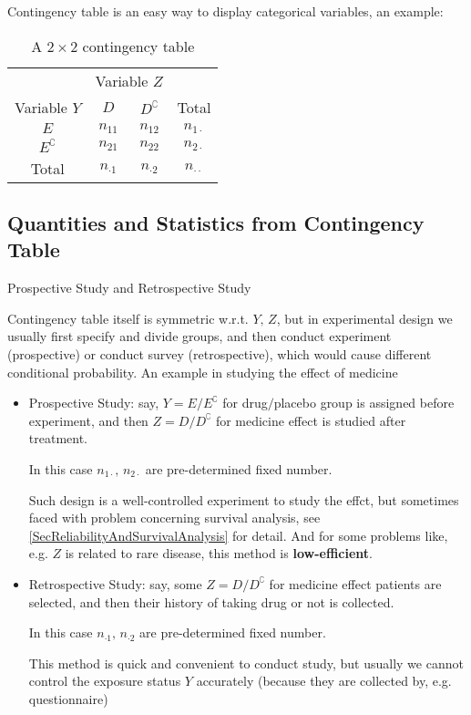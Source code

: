 Contingency table is an easy way to display categorical variables, an example:
\begin{table}[H]
    \centering
    \renewcommand\arraystretch{1}
    \caption{A $ 2\times 2 $ contingency table}
    \begin{tabular}{cccc}
        \hline
        \hline
        &\multicolumn{2}{c}{Variable $ Z $}&\\
        \cline{2-3}
        Variable $ Y $&$ D $&$ D^\complement $&Total\\
        \hline
        $ E $&$ n_{11} $&$ n_{12} $&$ n_{1\cdot } $\\
        $ E^\complement  $&$ n_{21} $&$ n_{22} $&$ n_{2\cdot } $\\
        \hline
        Total&$ n_{\cdot 1} $&$ n_{\cdot 2} $&$ n_{\cdot \cdot } $\\
        \hline
        \hline
    \end{tabular}
    \label{}
\end{table}
      

\subsection{Quantities and Statistics from Contingency Table}\label{SubSubSectionContingencyTableInBioStat}

\begin{point}
    Prospective Study and Retrospective Study
\end{point}

    Contingency table itself is symmetric w.r.t. $ Y,\,Z $, but in experimental design we usually first specify and divide groups, and then conduct experiment (prospective) or conduct survey (retrospective), which would cause different conditional probability. An example in studying the effect of medicine
    \begin{itemize}[topsep=2pt,itemsep=0pt]
        \item Prospective Study: say, $ Y=E\big/E^\complement $ for drug$ \big/ $placebo group is assigned before experiment, and then $ Z=D\big/D^\complement $ for medicine effect is studied after treatment. 
        
        In this case $ n_{1\cdot },\,n_{2\cdot } $ are pre-determined fixed number.

        Such design is a well-controlled experiment to study the effct, but sometimes faced with problem concerning survival analysis, see \autoref{SecReliabilityAndSurvivalAnalysis} for detail. And for some problems like, e.g. $ Z $ is related to rare disease, this method is \textbf{low-efficient}.

        \item Retrospective Study: say, some $ Z=D\big/D^\complement $ for medicine effect patients are selected, and then their history of taking drug or not is collected.
        
        In this case $ n_{\cdot 1},\,n_{\cdot 2} $ are pre-determined fixed number.

        This method is quick and convenient to conduct study, but usually we cannot control the exposure status $ Y $ accurately (because they are collected by, e.g. questionnaire)
    \end{itemize}

